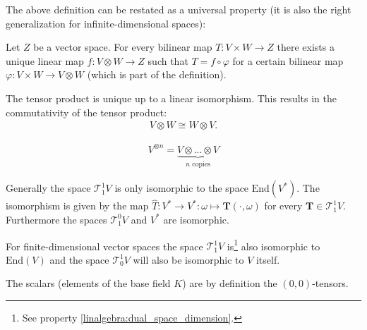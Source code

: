     
	The above definition can be restated as a universal property (it is also the right generalization for infinite-dimensional spaces):
	\begin{uproperty}\label{tensor:prop:universal_property}
	   	Let $Z$ be a vector space. For every bilinear map $T:V\times W\rightarrow Z$ there exists a unique linear map $f:V\otimes W\rightarrow Z$ such that $T = f\circ\varphi$ for a certain bilinear map $\varphi:V\times W\rightarrow V\otimes W$ (which is part of the definition).
	\end{uproperty}
	\begin{result}
	    	The tensor product is unique up to a linear isomorphism. This results in the commutativity of the tensor product:
	    	\begin{gather}
			\label{tensor:commutativity}
	        	V\otimes W \cong W\otimes V.
		\end{gather}
	\end{result}
    
	\begin{notation}
	    	\begin{gather}
	    		V^{\otimes n} = \underbrace{V\otimes...\otimes V}_{n\text{ copies}}
	    	\end{gather}
	\end{notation}
	
	\begin{remark}
		Generally the space $\mathcal{T}^1_1V$ is only isomorphic to the space $\text{End}(V^*)$. The isomorphism is given by the map $\hat{T}:V^*\rightarrow V^*:\omega\mapsto\mathbf{T}(\cdot, \omega)$ for every $\mathbf{T}\in\mathcal{T}^1_1V$. Furthermore the spaces $\mathcal{T}^0_1V$ and $V^*$ are isomorphic.
		
		For finite-dimensional vector spaces the space $\mathcal{T}^1_1V$ is\footnote{See property \ref{linalgebra:dual_space_dimension}.} also isomorphic to $\text{End}(V)$ and the space $\mathcal{T}^1_0V$ will also be isomorphic to $V$ itself.
	\end{remark}
	\begin{definition}[Scalar]
	    	The scalars (elements of the base field $K$) are by definition the $(0,0)$-tensors.
	\end{definition}

